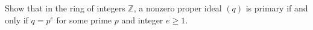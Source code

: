 Show that in the ring of integers $\mathbb{Z}$, a nonzero proper ideal $(q)$ is primary if and only if $q = p^e$ for some prime $p$ and integer $e \geq 1$.
